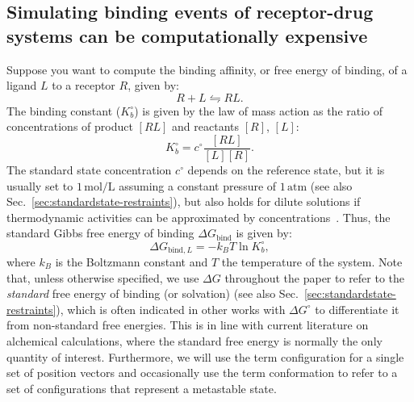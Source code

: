 \documentclass[9pt,bestpractices]{livecoms}
\begin{document}
\subsection{Simulating binding events of receptor-drug systems can be computationally expensive}
Suppose you want to compute the binding affinity, or free energy of binding, of a ligand $L$ to a receptor $R$, given by:
\begin{equation}
R+L \leftrightharpoons RL.
\end{equation}
The binding constant ($K_b^{\circ}$) is given by the law of mass action as the ratio of concentrations of product $[RL]$ and reactants $[R]$, $[L]$:
\begin{equation}\label{eq:law-mass-action}
 K_b^{\circ} = c^{\circ}\frac{[RL]}{[L][R]}.
\end{equation}
The standard state concentration $c^\circ$ depends on the reference state, but it is usually set to $1\,\mathrm{mol}/\mathrm{L}$ assuming a constant pressure of $1\,\mathrm{atm}$ (see also Sec.~\ref{sec:standardstate-restraints}), but also holds for dilute solutions if thermodynamic activities can be approximated by concentrations~\cite{gilson1997statisticalthermodynamic}.
Thus, the standard Gibbs free energy of binding $\Delta G_{\mathrm{bind}}$ is given by:
\begin{equation}
    \Delta G_{\mathrm{bind},L} = -k_BT\ln K_b^{\circ},
\end{equation}
where $k_B$ is the Boltzmann constant and $T$ the temperature of the system.
Note that, unless otherwise specified, we use $\Delta G$ throughout the paper to refer to the \textit{standard} free energy of binding (or solvation) (see also Sec.~\ref{sec:standardstate-restraints}), which is often indicated in other works with $\Delta G^{\circ}$ to differentiate it from non-standard free energies.
This is in line with current literature on alchemical calculations, where the standard free energy is normally the only quantity of interest. Furthermore, we will use the term configuration for a single set of position vectors and occasionally use the term conformation to refer to a set of configurations that represent a metastable state. 
\end{document}
